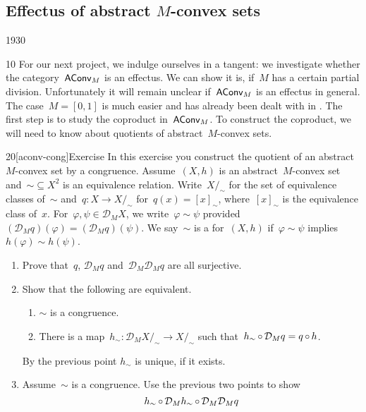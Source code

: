 \subsection{Effectus of abstract $M$-convex sets}\label{more-aconvm}
\begin{parsec}{1930}%
\begin{point}{10}%
For our next project,
    we indulge ourselves in a tangent:
    we investigate whether the category~$\mathsf{AConv}_M$ is an effectus.
We can show it is, if~$M$ has a certain partial division.
Unfortunately it will remain unclear if~$\mathsf{AConv}_M$ is an effectus in general.
The case~$M=[0,1]$ is much easier and has already been dealt with
        in \cite{statesofconvexsets}. 
The first step is to study the coproduct in~$\mathsf{AConv}_M$.
To construct the coproduct, we will need to know
    about quotients of abstract~$M$-convex sets.
\end{point}
\begin{point}{20}[aconv-cong]{Exercise}%
In this exercise you construct the quotient of an
    abstract~$M$-convex set by a congruence.
Assume~$(X,h)$ is an abstract~$M$-convex set
    and~${\sim} \subseteq X^2$ is an equivalence relation.
Write~$X/_\sim$ for the set of equivalence classes
    of~$\sim$
    and~$q\colon X \to X/_\sim$
    for~$q(x) = [x]_\sim$, where~$[x]_\sim$ is the equivalence class of~$x$.
For~$\varphi,\psi \in \mathcal{D}_M X$,
    we write~$\varphi \sim \psi$
    provided~$(\mathcal{D}_M q)(\varphi) = (\mathcal{D}_M q)(\psi)$.
We say~$\sim$ is a  for~$(X,h)$
if~$\varphi \sim \psi$ implies~$h(\varphi) \sim h(\psi)$.
\begin{enumerate}
\item
Prove that~$q$, $\mathcal{D}_M q$ and~$\mathcal{D}_M \mathcal{D}_M q$
    are all surjective.
\item
Show that the following are equivalent.
\begin{enumerate}
\item
$\sim$ is a congruence.
\item
There is a map~$h_\sim \colon \mathcal{D}_M X/_\sim \to X/_\sim$
    such that~$h_\sim \mathop{\circ} \mathcal{D}_M q = q \mathop{\circ} h$.
\end{enumerate}
By the previous point $h_\sim$ is unique, if it exists.
\item
Assume~$\sim$ is a congruence.
Use the previous two points to show
\begin{equation*}
h_\sim \after \mathcal{D}_M h_\sim \after \mathcal{D}_M \mathcal{D}_M q

\end{equation*}
\end{enumerate}
\end{point}
\end{parsec}
